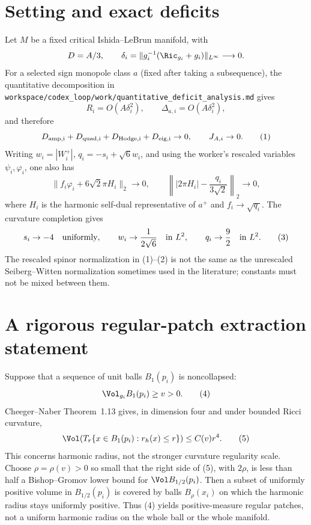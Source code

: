 
\section{Setting and exact deficits}
Let $M$ be a fixed critical Ishida--LeBrun manifold, with
\[
 D=A/3,\qquad
 \delta_i=\|g_i^{-1}(\Ric_{g_i}+g_i)\|_{L^\infty}\longrightarrow0.
\]
For a selected sign monopole class $a$ (fixed after taking a subsequence),
the quantitative decomposition in
\texttt{workspace/codex\_loop/work/quantitative\_deficit\_analysis.md}
gives
\[
 R_i=O(A\delta_i^2),\qquad
 \Delta_{a,i}=O(A\delta_i^2),
\]
and therefore
\[
 D_{\rm amp,i}+D_{\rm quad,i}+D_{\rm Hodge,i}+D_{\rm eig,i}\to0,
 \qquad J_{A,i}\to0.                                      \tag{1}
\]
Writing $w_i=|W^+_i|$, $q_i=-s_i+\sqrt6w_i$, and using the worker's
rescaled variables $\psi_i,\varphi_i$, one also has
\[
 \|f_i\varphi_i+6\sqrt2\pi H_i\|_2\to0,
 \qquad
 \left\||2\pi H_i|-\frac{q_i}{3\sqrt2}\right\|_2\to0,    \tag{2}
\]
where $H_i$ is the harmonic self-dual representative of $a^+$ and
$f_i\to\sqrt{q_i}$.  The curvature completion gives
\[
 s_i\to-4\quad\hbox{uniformly},\qquad
 w_i\to\frac1{2\sqrt6}\quad\hbox{in }L^2,
 \qquad q_i\to\frac92\quad\hbox{in }L^2.                  \tag{3}
\]
The rescaled spinor normalization in (1)--(2) is not the same as the
unrescaled Seiberg--Witten normalization sometimes used in the literature;
constants must not be mixed between them.

\section{A rigorous regular-patch extraction statement}
Suppose that a sequence of unit balls $B_1(p_i)$ is noncollapsed:
\[
 \Vol_{g_i}B_1(p_i)\ge v>0.                                \tag{4}
\]
Cheeger--Naber Theorem~1.13 gives, in dimension four and under bounded
Ricci curvature,
\[
 \Vol\!\left(T_r\{x\in B_1(p_i):r_h(x)\le r\}\right)
 \le C(v)r^4.                                               \tag{5}
\]
This concerns harmonic radius, not the stronger curvature regularity scale.
Choose $\rho=\rho(v)>0$ so small that the right side of (5), with $2\rho$,
is less than half a Bishop--Gromov lower bound for $\Vol B_{1/2}(p_i)$.
Then a subset of uniformly positive volume in $B_{1/2}(p_i)$ is covered by
balls $B_\rho(x_i)$ on which the harmonic radius stays uniformly positive.
Thus (4) yields positive-measure regular patches, not a uniform harmonic
radius on the whole ball or the whole manifold.

